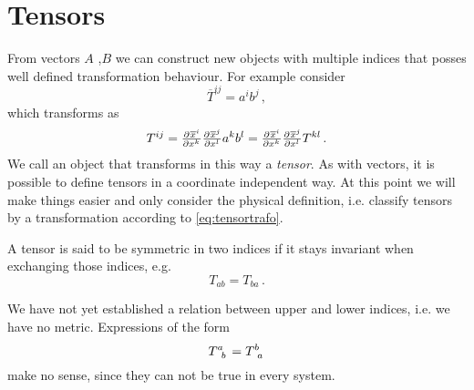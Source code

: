 \section{Tensors}
From vectors $A$ ,$B$ we can construct new objects with multiple indices that posses well defined transformation behaviour. 
For example consider
\begin{equation}
    \overline{T}^{ij}=a^ib^j\, ,
\end{equation}
which transforms as
\begin{equation}
    T^{ij}=\pd{\overline{x}^i}{{x^k}}\pd{\overline{x}^j}{{x^l}}a^kb^l=\pd{\overline{x}^i}{{x^k}}\pd{\overline{x}^j}{{x^l}}T^{kl}\,
   .\label{eq:tensortrafo}
\end{equation}
We call an object that transforms in this way a \emph{tensor}. 
As with vectors, it is possible to define tensors in a coordinate independent
way.
At this point we will make things easier and only consider the physical
definition, i.e. classify tensors by a transformation according to \eqref{eq:tensortrafo}.

A tensor is said to be symmetric in two indices if it stays invariant when exchanging those indices, e.g.
\begin{equation}
    T_{ab}=T_{ba}\, .
\end{equation}
\begin{remark}
We have not yet established a relation between upper and lower indices, i.e. we have no metric. Expressions of the form
\begin{equation}
    \tensor{T}{^a_b}=\tensor{T}{^b_a}
\end{equation}
make no sense, since they can not be true in every system.
\end{remark}
